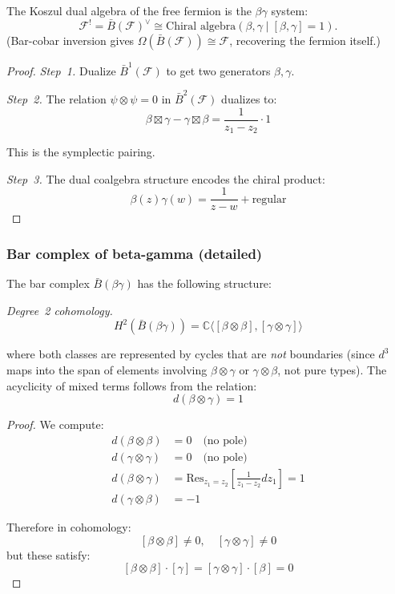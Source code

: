 \begin{theorem}
\label{thm:cobar-betagamma}
The Koszul dual algebra of the free fermion is the $\beta\gamma$ system:
\[\mathcal{F}^! = \bar{B}(\mathcal{F})^\vee \cong \text{Chiral algebra}(\beta, \gamma \mid [\beta,\gamma] = 1).\]
(Bar-cobar inversion gives $\Omega(\bar{B}(\mathcal{F})) \cong \mathcal{F}$, recovering the fermion itself.)
\end{theorem}

\begin{proof}
\emph{Step~1.} Dualize $\bar{B}^1(\mathcal{F})$ to get two generators $\beta, \gamma$.

\emph{Step~2.} The relation $\psi \otimes \psi = 0$ in $\bar{B}^2(\mathcal{F})$ dualizes to:
\[\beta \boxtimes \gamma - \gamma \boxtimes \beta = \frac{1}{z_1-z_2} \cdot 1\]

This is the symplectic pairing.

\emph{Step~3.} The dual coalgebra structure encodes the chiral product:
\[\beta(z)\gamma(w) = \frac{1}{z-w} + \text{regular}\]
\end{proof}

\subsubsection{Bar complex of beta-gamma (detailed)}

\begin{proposition}[\ClaimStatusProvedHere]
\label{prop:betagamma-bar-deg2}
The bar complex $\bar{B}(\beta\gamma)$ has the following structure:

\emph{Degree~2 cohomology.}
\[H^2(\bar{B}(\beta\gamma)) = \mathbb{C}\langle [\beta \otimes \beta], [\gamma \otimes \gamma] \rangle\]

where both classes are represented by cycles that are \emph{not} boundaries (since $d^3$ maps into the span of elements involving $\beta \otimes \gamma$ or $\gamma \otimes \beta$, not pure types).  The acyclicity of mixed terms follows from the relation:
\[d(\beta \otimes \gamma) = 1\]
\end{proposition}

\begin{proof}
We compute:
\begin{align}
d(\beta \otimes \beta) &= 0 \quad \text{(no pole)} \\
d(\gamma \otimes \gamma) &= 0 \quad \text{(no pole)} \\
d(\beta \otimes \gamma) &= \text{Res}_{z_1=z_2}\left[\frac{1}{z_1-z_2} dz_1\right] = 1 \\
d(\gamma \otimes \beta) &= -1
\end{align}

Therefore in cohomology:
\[[\beta \otimes \beta] \neq 0, \quad [\gamma \otimes \gamma] \neq 0\]
but these satisfy:
\[[\beta \otimes \beta] \cdot [\gamma] = [\gamma \otimes \gamma] \cdot [\beta] = 0\]
\end{proof}

